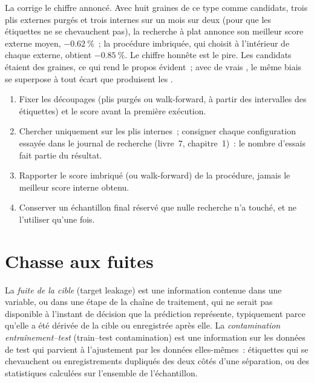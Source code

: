 La  corrige le chiffre annoncé. Avec huit graines de ce type comme candidats, trois plis externes purgés et trois
internes sur un mois sur deux (pour que les étiquettes ne se chevauchent pas), la recherche à plat annonce son meilleur score externe moyen,
$-0.62~\%$~; la procédure imbriquée, qui choisit à l'intérieur de chaque  externe, obtient $-0.85~\%$. Le chiffre honnête est le
pire. Les candidats étaient des graines, ce qui rend le propos évident~; avec de vrais , le même biais se superpose à
tout écart que produisent les .

\begin{method}\label{met:ml:validation:search}
\begin{enumerate}
\item Fixer les découpages (plis purgés ou walk-forward, à partir des intervalles des étiquettes) et le score avant la première exécution.
\item Chercher uniquement sur les plis internes~; consigner chaque configuration essayée dans le journal de recherche (livre~7, chapitre~1)~: le
nombre d'essais fait partie du résultat.
\item Rapporter le score imbriqué (ou walk-forward) de la procédure, jamais le meilleur score interne obtenu.
\item Conserver un échantillon final réservé que nulle recherche n'a touché, et ne l'utiliser qu'une fois.
\end{enumerate}
\end{method}

\section{Chasse aux fuites}

\begin{definition}\label{def:ml:validation:leakage}
La \emph{fuite de la cible} (target leakage) est une information contenue dans une variable, ou dans une étape de la chaîne de traitement, qui ne serait pas
disponible à l'instant de décision que la prédiction représente, typiquement parce qu'elle a été dérivée de la cible
ou enregistrée après elle. La \emph{contamination entraînement--test} (train--test contamination) est une information sur les données de test
qui parvient à l'ajustement par les données elles-mêmes~: étiquettes qui se chevauchent ou enregistrements dupliqués des deux côtés d'une séparation,
ou des statistiques calculées sur l'ensemble de l'échantillon.
\end{definition}

